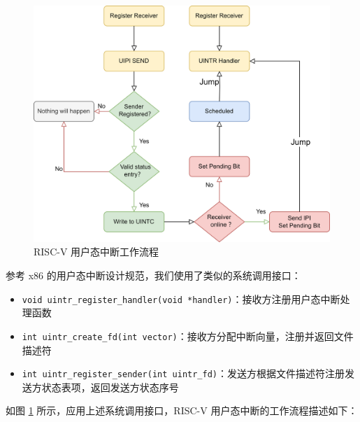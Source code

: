 \begin{figure}
    \centering
    \includegraphics[width=0.8\linewidth]{figures/uintr2.png}
    \caption{RISC-V 用户态中断工作流程}
    \label{fig:uintr2}
\end{figure}

参考 x86 的用户态中断设计规范\cite{x86uintr}，我们使用了类似的系统调用接口：

\begin{itemize}
    \item \texttt{void uintr_register_handler(void *handler)}：接收方注册用户态中断处理函数
    \item \texttt{int uintr_create_fd(int vector)}：接收方分配中断向量，注册并返回文件描述符
    \item \texttt{int uintr_register_sender(int uintr_fd)}：发送方根据文件描述符注册发送方状态表项，返回发送方状态序号
\end{itemize}

如图 \ref{fig:uintr2} 所示，应用上述系统调用接口，RISC-V 用户态中断的工作流程描述如下：

